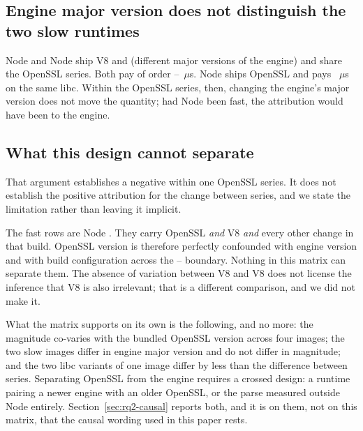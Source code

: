 \documentclass[preprint,12pt,authoryear]{elsarticle}
\begin{document}
\subsection{Engine major version does not distinguish the two slow runtimes}

Node \NodeEighteenNodeMajor{} and Node \NodeTwentyNodeMajor{} ship V8
\NodeEighteenVeight{} and \NodeTwentyVeight{} (different major versions of the
engine) and share the OpenSSL \NodeEighteenOpensslSeries{} series. Both pay of
order \NodeEighteenProbeThrows--\NodeTwentyProbeThrows~$\mu$s. Node
\NodeTwentySixMuslNodeMajor{} ships OpenSSL \NodeTwentySixMuslOpensslSeries{} and
pays \NodeTwentySixMuslProbeThrows~$\mu$s on the same libc. Within the OpenSSL
\NodeEighteenOpensslSeries{} series, then, changing the engine's major version
does not move the quantity; had Node \NodeTwentyNodeMajor{} been fast, the
attribution would have been to the engine.

\subsection{What this design cannot separate}\label{sec:cannot-separate}

That argument establishes a negative within one OpenSSL series. It does not
establish the positive attribution for the change between series, and we state
the limitation rather than leaving it implicit.

The fast rows are Node \NodeTwentySixMuslNodeMajor. They carry OpenSSL
\NodeTwentySixMuslOpensslSeries{} \emph{and} V8 \NodeTwentySixMuslVeight{}
\emph{and} every other change in that build. OpenSSL version is therefore
perfectly confounded with engine version and with build configuration across the
\NodeEighteenOpensslSeries--\NodeTwentySixMuslOpensslSeries{} boundary. Nothing
in this matrix can separate them. The absence of variation between V8
\NodeEighteenVeight{} and V8 \NodeTwentyVeight{} does not license the inference
that V8 \NodeTwentySixMuslVeight{} is also irrelevant; that is a different
comparison, and we did not make it.

What the matrix supports on its own is the following, and no more: the
magnitude co-varies with the bundled OpenSSL version across four images; the two
slow images differ in engine major version and do not differ in magnitude; and
the two libc variants of one image differ by less than the difference between
series. Separating OpenSSL from the engine requires a crossed design: a
runtime pairing a newer engine with an older OpenSSL, or the parse measured
outside Node entirely. Section~\ref{sec:rq2-causal} reports both, and it is on
them, not on this matrix, that the causal wording used in this paper rests.
\end{document}

